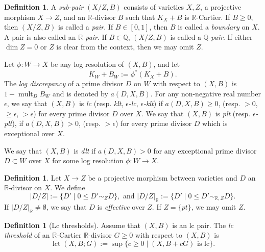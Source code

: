 \documentclass[11pt]{amsart}
\numberwithin{equation}{section}
\newcommand{\Qq}{\mathbb{Q}}
\newcommand{\Rr}{\mathbb{R}}
\newcommand{\lct}{\operatorname{lct}}
\newcommand{\mult}{\operatorname{mult}}
\theoremstyle{definition}
\theoremstyle{definition}
\newtheorem{defn}[thm]{Definition}
\begin{document}
\begin{defn}\label{defn: positivity}
A \emph{sub-pair} $(X/Z,B)$ consists of varieties $X,Z$, a projective morphism $X\to Z$, and an $\Rr$-divisor $B$ such that $K_X+B$ is $\Rr$-Cartier. If $B\geq 0$, then $(X/Z,B)$ is called a \emph{pair}. If $B\in [0,1]$, then $B$ is called a \emph{boundary} on $X$. A pair is also called an \emph{$\Rr$-pair}. If $B\in\Qq$, $(X/Z,B)$ is called a \emph{$\Qq$-pair}. If either $\dim Z=0$ or $Z$ is clear from the context, then we may omit $Z$.
	
Let $\phi:W\to X$ be any log resolution of $(X,B)$, and let
$$K_W+B_W:=\phi^{*}(K_X+B).$$
The \emph{log discrepancy} of a prime divisor $D$ on $W$ with respect to $(X,B)$ is $1-\mult_{D}B_W$ and is denoted by $a(D,X,B).$ For any non-negative real number $\epsilon$, we say that $(X,B)$ is \emph{lc} (resp. \emph{klt}, \emph{$\epsilon$-lc}, \emph{$\epsilon$-klt}) if $a(D,X,B)\geq 0$, (resp. $>0$, $\geq\epsilon$, $>\epsilon$) for every prime divisor $D$ over $X$. We say that $(X,B)$ is \emph{plt} (resp. \emph{$\epsilon$-plt}), if $a(D,X,B)>0$, (resp. $>\epsilon$) for every prime divisor $D$ which is exceptional over $X$.
	
We say that $(X,B)$ is \emph{dlt} if $a(D,X,B)>0$ for any exceptional prime divisor $D\subset W$ over $X$ for some log resolution $\phi:W\rightarrow X$.
\end{defn}

\begin{defn}
Let $X\rightarrow Z$ be a projective morphism between varieties and $D$ an $\Rr$-divisor on $X$. We define
$$|D/Z|:=\{D'\mid 0\leq D'\sim_Z D\},\text{ and }|D/Z|_{\Rr}:=\{D'\mid 0\leq D'\sim_{\Rr,Z} D\}.$$
If $|D/Z|_{\Rr}\not=\emptyset$, we say that $D$ is \emph{effective} over $Z$. If $Z=\{pt\}$, we may omit $Z$.%
\end{defn}

\begin{defn}[Lc thresholds] 
Assume that $(X,B)$ is an lc pair. The \emph{lc threshold} of an $\Rr$-Cartier $\Rr$-divisor $G\geq 0$ with respect to $(X,B)$ is 
	$$\lct(X,B;G):=\sup\{c\ge 0\mid (X,B+cG) \text{ is lc}\}.$$ 
\end{defn}
\end{document}
